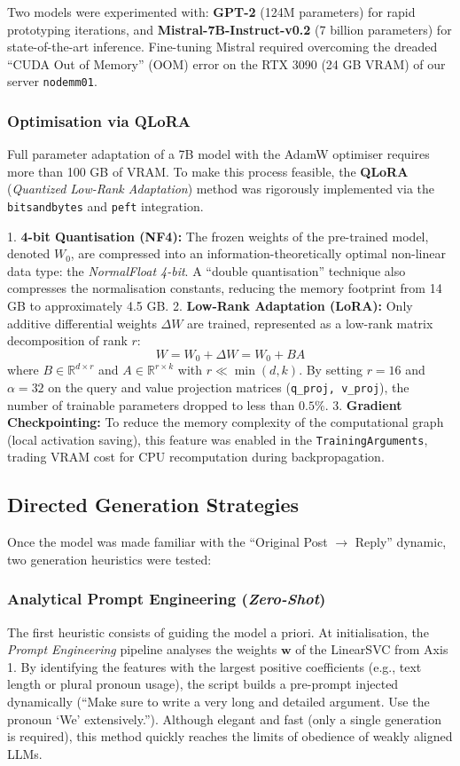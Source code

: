 \documentclass[11pt,a4paper]{article}
\begin{document}
Two models were experimented with: \textbf{GPT-2} (124M parameters) for rapid
prototyping iterations, and \textbf{Mistral-7B-Instruct-v0.2} (7 billion
parameters) for state-of-the-art inference. Fine-tuning Mistral required
overcoming the dreaded ``CUDA Out of Memory'' (OOM) error on the RTX 3090
(24 GB VRAM) of our server \texttt{nodemm01}.

\subsubsection{Optimisation via QLoRA}
Full parameter adaptation of a 7B model with the AdamW optimiser requires more
than 100 GB of VRAM. To make this process feasible, the \textbf{QLoRA}
(\textit{Quantized Low-Rank Adaptation}) method was rigorously implemented
via the \texttt{bitsandbytes} and \texttt{peft} integration.

1. \textbf{4-bit Quantisation (NF4):} The frozen weights of the pre-trained
model, denoted $W_0$, are compressed into an information-theoretically optimal
non-linear data type: the \textit{NormalFloat 4-bit}. A ``double quantisation''
technique also compresses the normalisation constants, reducing the memory
footprint from 14 GB to approximately 4.5 GB.
2. \textbf{Low-Rank Adaptation (LoRA):} Only additive differential weights
$\Delta W$ are trained, represented as a low-rank matrix decomposition of
rank $r$:
\begin{equation}
    W = W_0 + \Delta W = W_0 + B A
\end{equation}
where $B \in \mathbb{R}^{d \times r}$ and $A \in \mathbb{R}^{r \times k}$
with $r \ll \min(d, k)$. By setting $r=16$ and $\alpha=32$ on the query and
value projection matrices (\texttt{q\_proj, v\_proj}), the number of trainable
parameters dropped to less than $0.5\%$.
3. \textbf{Gradient Checkpointing:} To reduce the memory complexity of the
computational graph (local activation saving), this feature was enabled in the
\texttt{TrainingArguments}, trading VRAM cost for CPU recomputation during
backpropagation.

\subsection{Directed Generation Strategies}
Once the model was made familiar with the ``Original Post $\rightarrow$ Reply''
dynamic, two generation heuristics were tested:

\subsubsection{Analytical Prompt Engineering (\textit{Zero-Shot})}
The first heuristic consists of guiding the model a priori. At initialisation,
the \textit{Prompt Engineering} pipeline analyses the weights $\mathbf{w}$ of
the LinearSVC from Axis 1. By identifying the features with the largest
positive coefficients (e.g., text length or plural pronoun usage), the script
builds a pre-prompt injected dynamically (``Make sure to write a very long and
detailed argument. Use the pronoun `We' extensively.''). Although elegant and
fast (only a single generation is required), this method quickly reaches the
limits of obedience of weakly aligned LLMs.
\end{document}
